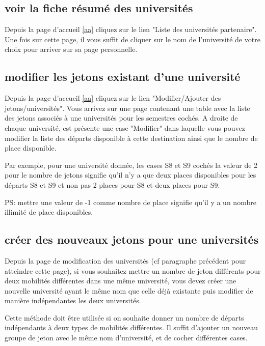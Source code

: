 \subsection{voir la fiche résumé des universités}

Depuis la page d'accueil \ref{aa} cliquez sur le lien "Liste des universités partenaire". Une fois sur cette page, il vous suffit de cliquer sur le nom de l'université de votre choix pour arriver sur sa page personnelle.
 
\subsection{modifier les jetons existant d'une université}

Depuis la page d'accueil \ref{aa} cliquez sur le lien "Modifier/Ajouter des jetons/universités". Vous arrivez sur une page contenant une table avec la liste des jetons associés à une universités pour les semestres cochés. A droite de chaque université, est présente une case "Modifier" dans laquelle vous pouvez modifier la liste des départs disponible à cette destination ainsi que le nombre de place disponible.

\smallbreak

Par exemple, pour une université donnée, les cases S8 et S9 cochés la valeur de 2 pour le nombre de jetons signifie qu'il n'y a que deux places disponibles pour les départs S8 et S9 et non pas 2 places pour S8 et deux places pour S9.

\smallbreak

PS: mettre une valeur de -1 comme nombre de place signifie qu'il y a un nombre illimité de place disponibles.

\subsection{créer des nouveaux jetons pour une universités}

Depuis la page de modification des universités (cf paragraphe précédent pour atteindre cette page), si vous souhaitez mettre un nombre de jeton différents pour deux mobilités différentes dans une même université, vous devez créer une nouvelle université ayant le même nom que celle déjà existante puis modifier de manière indépendantes les deux universités.

\smallbreak

Cette méthode doit être utilisée si on souhaite donner un nombre de départs indépendants à deux types de mobilités différentes. Il suffit d'ajouter un nouveau groupe de jeton avec le même nom d'université, et de cocher différentes cases.


